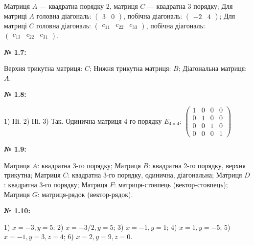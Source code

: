 \documentclass[12pt,a4paper]{article}
\begin{document}
    Матриця $A$ --- квадратна порядку 2, матриця $C$ --- квадратна 3 порядку;
    Для матриці $A$ головна діагональ: \(
    \begin{pmatrix}
    3 & 0 
    \end{pmatrix}
    \), побічна діагональ:  \(
    \begin{pmatrix}
    -2 & 4 
    \end{pmatrix}
    \); Для матриці $C$ головна діагональ: \(
    \begin{pmatrix}
    c_{11} & c_{22} & c_{33} 
    \end{pmatrix}
    \), побічна діагональ:  \(
    \begin{pmatrix}
    c_{13} & c_{22} & c_{31} 
    \end{pmatrix}
    \).

    \vspace{1em}

    \noindent \textbf{№ 1.7:}

    Верхня трикутна матриця: $C$; Нижня трикутна матриця: $B$; Діагональна матриця: $A$.

    \vspace{1em}

    \noindent \textbf{№ 1.8:}

    1) Ні. 2) Ні. 3) Так. Одинична матриця 4-го порядку $E_{4\times4}$:
    \(
    \begin{pmatrix}
    1 & 0 & 0 & 0 \\
    0 & 1 & 0 & 0 \\
    0 & 0 & 1 & 0 \\
    0 & 0 & 0 & 1
    \end{pmatrix}
    \)

    \vspace{1em}

    \noindent \textbf{№ 1.9:}

    Матриця $A$: квадратна 3-го порядку;
    Матриця $B$: квадратна 2-го порядку, верхня трикутна;
    Матриця $C$: квадратна 3-го порядку, одинична, діагональна; 
    Матриця $D$: квадратна 3-го порядку;
    Матриця $F$: матриця-стовпець (вектор-стовпець);
    Матриця $G$: матриця-рядок (вектор-рядок).

    \vspace{1em}

    \noindent \textbf{№ 1.10:}

    1) $x = -3, y = 5$; 
    2) $x = -3/2, y = 5$; 
    3) $x = -1, y = 1$; 
    4) $x = 1, y = -5$; 
    5) $x = -1, y = 3, z = 4$;
    6) $x = 2, y = 9, z = 0$.
\end{document}
